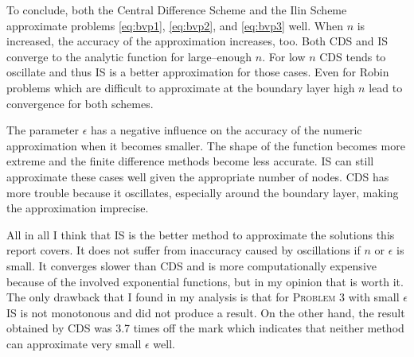 \documentclass[a4paper, 12pt, reqno]{article}
\begin{document}
To conclude, both the Central Difference Scheme and the Ilin Scheme approximate
problems \eqref{eq:bvp1}, \eqref{eq:bvp2}, and \eqref{eq:bvp3} well. When $n$ 
is increased, the accuracy of the approximation increases, too. Both CDS and IS
converge to the analytic function for large--enough $n$. For low $n$ CDS tends
to oscillate and thus IS is a better approximation for those cases. Even for
Robin problems which are difficult to approximate at the boundary layer high
$n$ lead to convergence for both schemes.

The parameter $\epsilon$ has a negative influence on the accuracy of the
numeric approximation when it becomes smaller. The shape of the function 
becomes more extreme and the finite difference methods become less accurate. IS 
can still approximate these cases well given the appropriate number of
nodes. CDS has more trouble because it oscillates, especially around the
boundary layer, making the approximation imprecise.

All in all I think that IS is the better method to approximate the solutions
this report covers. It does not suffer from inaccuracy caused by oscillations
if $n$ or $\epsilon$ is small. It converges slower than CDS and is
more computationally expensive because of the involved exponential functions,
but in my opinion that is worth it. The only drawback that I found in my
analysis is that for \textsc{Problem 3} with small $\epsilon$ IS is not
monotonous and did not produce a result. On the other hand, the result obtained
by CDS was 3.7 times off the mark which indicates that neither method can
approximate very small $\epsilon$ well.
\end{document}
